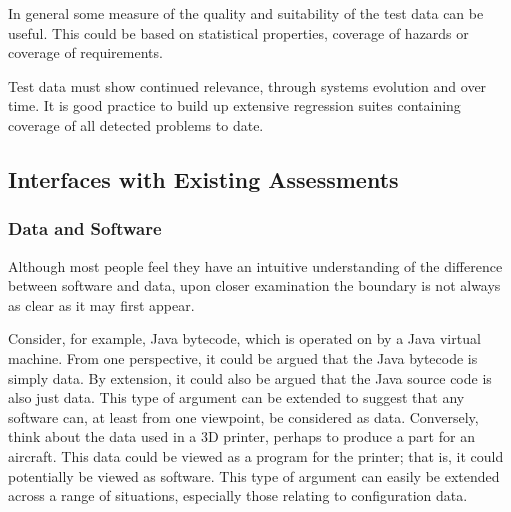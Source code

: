In general some measure of the quality and suitability of the test data can be useful. This could be based on statistical properties, coverage of hazards or coverage of requirements. 

Test data must show continued relevance, through systems evolution and over time. It is good practice to build up extensive regression suites containing coverage of all detected problems to date.

\subsection{Interfaces with Existing Assessments}
\subsubsection{Data and Software}
Although most people feel they have an intuitive understanding of the difference between software and data, upon closer examination the boundary is not always as clear as it may first appear.

Consider, for example, Java bytecode, which is operated on by a Java virtual machine. From one perspective, it could be argued that the Java bytecode is simply data. By extension, it could also be argued that the Java source code is also just data. This type of argument can be extended to suggest that any software can, at least from one viewpoint, be considered as data. Conversely, think about the data used in a 3D printer, perhaps to produce a part for an aircraft. This data could be viewed as a program for the printer; that is, it could potentially be viewed as software. This type of argument can easily be extended across a range of situations, especially those relating to \gls{configuration data}.

